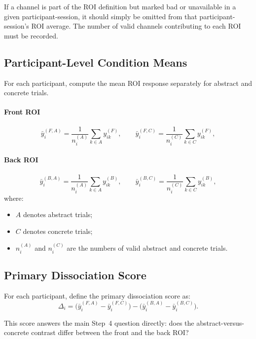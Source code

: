 If a channel is part of the ROI definition but marked bad or unavailable in a given participant-session,
it should simply be omitted from that participant-session's ROI average.
The number of valid channels contributing to each ROI must be recorded.

\subsection{Participant-Level Condition Means}
For each participant, compute the mean ROI response separately for abstract and concrete trials.

\paragraph{Front ROI}
\begin{equation}
\bar{y}^{(F,A)}_i
=
\frac{1}{n_i^{(A)}}
\sum_{k \in A} y^{(F)}_{ik},
\qquad
\bar{y}^{(F,C)}_i
=
\frac{1}{n_i^{(C)}}
\sum_{k \in C} y^{(F)}_{ik},
\end{equation}

\paragraph{Back ROI}
\begin{equation}
\bar{y}^{(B,A)}_i
=
\frac{1}{n_i^{(A)}}
\sum_{k \in A} y^{(B)}_{ik},
\qquad
\bar{y}^{(B,C)}_i
=
\frac{1}{n_i^{(C)}}
\sum_{k \in C} y^{(B)}_{ik},
\end{equation}
where:
\begin{itemize}
    \item \(A\) denotes abstract trials;
    \item \(C\) denotes concrete trials;
    \item \(n_i^{(A)}\) and \(n_i^{(C)}\) are the numbers of valid abstract and concrete trials.
\end{itemize}

\subsection{Primary Dissociation Score}
For each participant, define the primary dissociation score as:
\begin{equation}
\Delta_i
=
\bigl(\bar{y}^{(F,A)}_i - \bar{y}^{(F,C)}_i\bigr)
-
\bigl(\bar{y}^{(B,A)}_i - \bar{y}^{(B,C)}_i\bigr).
\end{equation}

This score answers the main Step~4 question directly:
does the abstract-versus-concrete contrast differ between the front and the back ROI?

